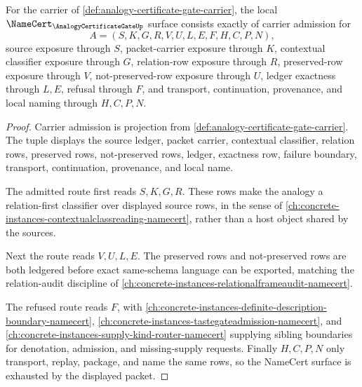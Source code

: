 \begin{theorem}
\label{thm:analogy-certificate-gate-namecert-obligations}
For the carrier of \autoref{def:analogy-certificate-gate-carrier}, the local $\NameCert_{\AnalogyCertificateGateUp}$ surface consists exactly of carrier admission for
$$
A=(S,K,G,R,V,U,L,E,F,H,C,P,N),
$$
source exposure through $S$, packet-carrier exposure through $K$, contextual classifier exposure through $G$, relation-row exposure through $R$, preserved-row exposure through $V$, not-preserved-row exposure through $U$, ledger exactness through $L,E$, refusal through $F$, and transport, continuation, provenance, and local naming through $H,C,P,N$.
\end{theorem}
\begin{proof}
Carrier admission is projection from \autoref{def:analogy-certificate-gate-carrier}. The tuple displays the source ledger, packet carrier, contextual classifier, relation rows, preserved rows, not-preserved rows, ledger, exactness row, failure boundary, transport, continuation, provenance, and local name.

The admitted route first reads $S,K,G,R$. These rows make the analogy a relation-first classifier over displayed source rows, in the sense of \autoref{ch:concrete-instances-contextualclassreading-namecert}, rather than a host object shared by the sources.

Next the route reads $V,U,L,E$. The preserved rows and not-preserved rows are both ledgered before exact same-schema language can be exported, matching the relation-audit discipline of \autoref{ch:concrete-instances-relationalframeaudit-namecert}.

The refused route reads $F$, with \autoref{ch:concrete-instances-definite-description-boundary-namecert}, \autoref{ch:concrete-instances-tastegateadmission-namecert}, and \autoref{ch:concrete-instances-supply-kind-router-namecert} supplying sibling boundaries for denotation, admission, and missing-supply requests. Finally $H,C,P,N$ only transport, replay, package, and name the same rows, so the NameCert surface is exhausted by the displayed packet.
\end{proof}

